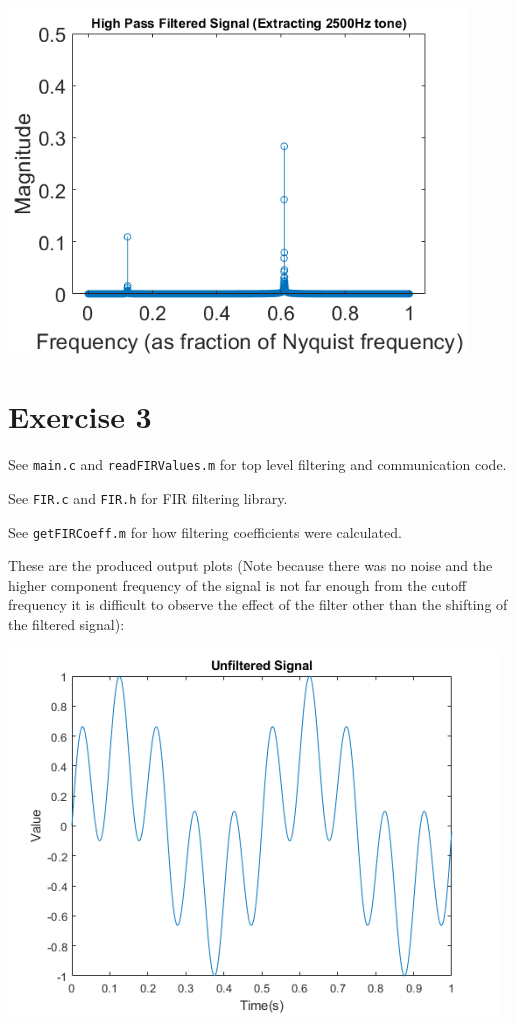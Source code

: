 \documentclass[12pt]{article}
\begin{document}
\begin{center}
    \includegraphics[width=4.8in]{highpass_fir.png}
\end{center}

\section*{Exercise 3}
See \verb|main.c| and \verb|readFIRValues.m| for top level filtering and communication code.

See \verb|FIR.c| and \verb|FIR.h| for FIR filtering library.

See \verb|getFIRCoeff.m| for how filtering coefficients were calculated.

These are the produced output plots (Note because there was no noise and the higher component frequency of the signal is not far enough from the cutoff frequency it is difficult to observe the effect of the filter other than the shifting of the filtered signal):

\includegraphics[width=5.1in]{3_u.png}
\end{document}
